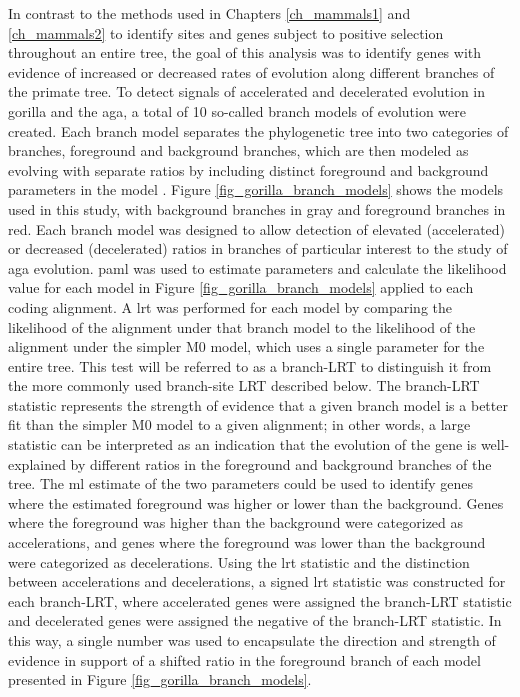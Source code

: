 In contrast to the \sw methods used in Chapters \ref{ch_mammals1} and
\ref{ch_mammals2} to identify sites and genes subject to positive
selection throughout an entire tree, the goal of this analysis was to
identify genes with evidence of increased or decreased rates of
evolution along different branches of the primate tree. To detect
signals of accelerated and decelerated evolution in gorilla and the
\ac{aga}, a total of 10 so-called branch models of evolution were
created. Each branch model separates the phylogenetic tree into two
categories of branches, foreground and background branches, which are
then modeled as evolving with separate \dnds ratios by including
distinct foreground and background \omg parameters in the model
\citep{Yang1998,Yang1998a}. Figure \ref{fig_gorilla_branch_models}
shows the models used in this study, with background branches in gray
and foreground branches in red. Each branch model was designed to
allow detection of elevated (accelerated) or decreased (decelerated)
\dnds ratios in branches of particular interest to the study of
\ac{aga} evolution. \ac{paml} was used to estimate parameters and
calculate the likelihood value for each model in Figure
\ref{fig_gorilla_branch_models} applied to each coding alignment. A
\ac{lrt} was performed for each model by comparing the likelihood of
the alignment under that branch model to the likelihood of the
alignment under the simpler M0 model, which uses a single \omg
parameter for the entire tree. This test will be referred to as a
branch-LRT to distinguish it from the more commonly used branch-site
LRT described below. The branch-LRT statistic represents the strength
of evidence that a given branch model is a better fit than the simpler
M0 model to a given alignment; in other words, a large statistic can
be interpreted as an indication that the evolution of the gene is
well-explained by different \dnds ratios in the foreground and
background branches of the tree. The \ac{ml} estimate of the two \omg
parameters could be used to identify genes where the estimated
foreground \omg was higher or lower than the background. Genes where
the foreground \omg was higher than the background were categorized as
accelerations, and genes where the foreground \omg was lower than the
background were categorized as decelerations. Using the \ac{lrt}
statistic and the distinction between accelerations and decelerations,
a signed \ac{lrt} statistic was constructed for each branch-LRT, where
accelerated genes were assigned the branch-LRT statistic and
decelerated genes were assigned the negative of the branch-LRT
statistic. In this way, a single number was used to encapsulate the
direction and strength of evidence in support of a shifted \dnds ratio
in the foreground branch of each model presented in Figure
\ref{fig_gorilla_branch_models}.

